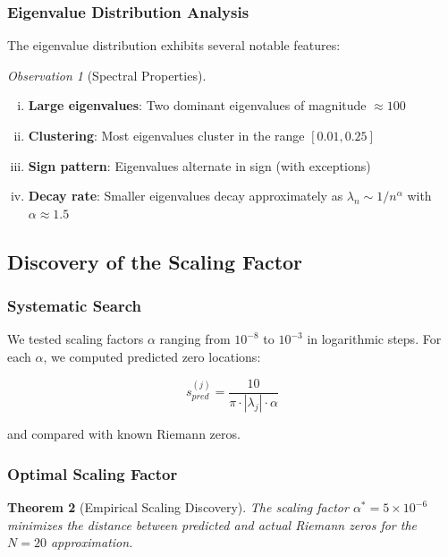 \documentclass[12pt,letterpaper]{article}
\theoremstyle{plain}
\newtheorem{theorem}{Theorem}[section]
\theoremstyle{definition}
\theoremstyle{remark}
\newtheorem{observation}[theorem]{Observation}
\begin{document}
\subsubsection{Eigenvalue Distribution Analysis}

The eigenvalue distribution exhibits several notable features:

\begin{observation}[Spectral Properties]\label{obs:spectral_props}
\begin{enumerate}[(i)]
\item \textbf{Large eigenvalues}: Two dominant eigenvalues of magnitude $\approx 100$
\item \textbf{Clustering}: Most eigenvalues cluster in the range $[0.01, 0.25]$
\item \textbf{Sign pattern}: Eigenvalues alternate in sign (with exceptions)
\item \textbf{Decay rate}: Smaller eigenvalues decay approximately as $\lambda_n \sim 1/n^{\alpha}$ with $\alpha \approx 1.5$
\end{enumerate}
\end{observation}

\subsection{Discovery of the Scaling Factor}

\subsubsection{Systematic Search}

We tested scaling factors $\alpha$ ranging from $10^{-8}$ to $10^{-3}$ in logarithmic steps. For each $\alpha$, we computed predicted zero locations:

\begin{equation}
s_{pred}^{(j)} = \frac{10}{\pi \cdot |\lambda_j| \cdot \alpha}
\end{equation}

and compared with known Riemann zeros.

\subsubsection{Optimal Scaling Factor}

\begin{theorem}[Empirical Scaling Discovery]\label{thm:scaling}
The scaling factor $\alpha^* = 5 \times 10^{-6}$ minimizes the distance between predicted and actual Riemann zeros for the $N = 20$ approximation.
\end{theorem}
\end{document}
